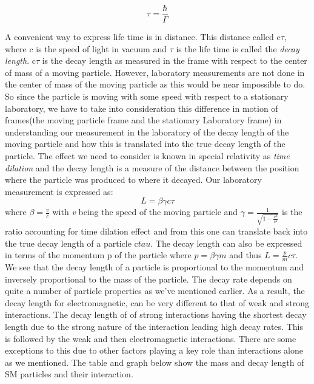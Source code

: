 \begin{equation}
  \tau = \frac{\hbar}{\Gamma}
\end{equation}

 A convenient way to express life time is in distance. This distance called c$\tau$, where c is the speed of light in vacuum and $\tau$ is the life time is called the \textit{decay length}. c$\tau$ is the decay length as measured in the frame with respect to the center of mass of a moving particle. However, laboratory measurements are not done in the center of mass of the moving particle as this would be near impossible to do. So since the particle is moving with some speed with respect to a stationary laboratory, we have to take into consideration this difference in motion of frames(the moving particle frame and the stationary Laboratory frame) in understanding our measurement in the laboratory of the decay length of the moving particle and how this is translated into the true decay length of the particle. The effect we need to consider is known in special relativity as \textit{time dilation} and the decay length is a measure of the distance between the position where the particle was produced to where it decayed. Our laboratory measurement is expressed as:
\begin{equation}
 L = \beta \gamma c\tau
\end{equation}
where $\beta = \frac{v}{c} $ with \textit{v} being the speed of the moving particle and $\gamma = \frac{1}{\sqrt{1 - \frac{v^{2}}{c^{2}}}}$ is the ratio accounting for time dilation effect and from this one can translate back into the true decay length of a particle c$tau$.
The decay length can also be expressed in terms of the momentum p of the particle where $p =\beta \gamma m$ and thus $L = \frac{p}{m}c\tau$.
We see that the decay length of a particle is proportional to the momentum and inversely proportional to the mass of the particle.
\newline
The decay rate depends on quite a number of particle properties as we've mentioned earlier. As a result, the decay length for electromagnetic, can be very different to that of weak and strong interactions. The decay length of of strong interactions having the shortest decay length due to the strong nature of the interaction leading high decay rates. This is followed by the weak and then electromagnetic interactions. There are some exceptions to this due to other factors playing a key role than interactions alone as we mentioned.
The table and graph below show the mass and decay length of SM particles and their interaction.

